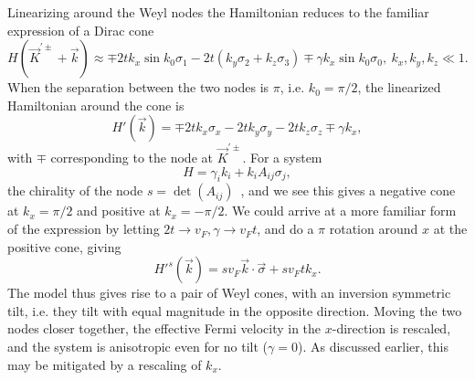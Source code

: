 Linearizing around the Weyl nodes the Hamiltonian reduces to the familiar expression of a Dirac cone
\begin{equation}
  \label{eq:7}
  H(\vec{K} ^{'\pm} + \vec{k}) \approx \mp 2 t k_{x} \sin k_{0} \sigma_{1} - 2 t (k_{y} \sigma_{2} + k_{z} \sigma_{3}) \mp \gamma k_{x} \sin k_{0} \sigma_{0}, \: k_{x}, k_{y}, k_{z} \ll 1.
\end{equation}
When the separation between the two nodes is \(\pi\), i.e. \(k_{0} = \pi/ 2 \), the linearized Hamiltonian around the cone is
\begin{equation}
  \label{eq:8}
  H'(\vec{k}) = \mp 2 t k_{x} \sigma_{x} - 2t k_{y} \sigma_{y} - 2 t k_{z} \sigma_{z} \mp \gamma k_{x},
\end{equation}
with \( \mp \) corresponding to the node at \( \vec{K}^{' \pm} \).
For a system
\begin{equation}
  \label{eq:155}
  H = \gamma_i k_i + k_i A_{ij} \sigma_j,
\end{equation}
the chirality of the node \( s = \det(A_{ij}) \)~\cite{mccormickMinimalModelsTopological2017}, and we see this gives a negative cone at \( k_x = \pi /2 \) and positive at \( k_x = -\pi /2 \).
We could arrive at a more familiar form of the expression by letting \( 2 t \to v_F, \gamma \to v_F t \), and do a \( \pi \) rotation around \( x \) at the positive cone, giving
\begin{equation}
  \label{eq:158}
  H'^{s}(\vec{k}) = s v_F \vec{k} \cdot \vec{\sigma} + s v_F t k_x.
\end{equation}
The model thus gives rise to a pair of Weyl cones, with an inversion symmetric tilt, i.e. they tilt with equal magnitude in the opposite direction.
Moving the two nodes closer together, the effective Fermi velocity in the \(x\)-direction is rescaled, and the system is anisotropic even for no tilt (\(\gamma=0\)).
As discussed earlier, this may be mitigated by a rescaling of \( k_x \).


